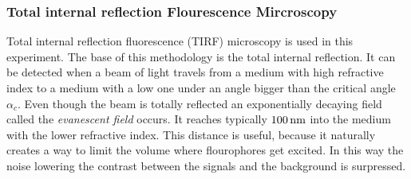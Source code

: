         \subsubsection{Total internal reflection Flourescence Mircroscopy}
            Total internal reflection fluorescence (TIRF) microscopy is used in this experiment. The base of this methodology is the total internal reflection. It can be detected when a beam of light travels from a medium with high refractive index to a medium with a low one under an angle bigger than the critical angle $\alpha_c$.
            Even though the beam is totally reflected an exponentially decaying field called the \textit{evanescent field} occurs. It reaches typically $\unit[100]{nm}$ into the medium with the lower refractive index.
            This distance is useful, because it naturally creates a way to limit the volume where flourophores get excited. In this way the noise lowering the contrast between the signals and the background is surpressed.
            
